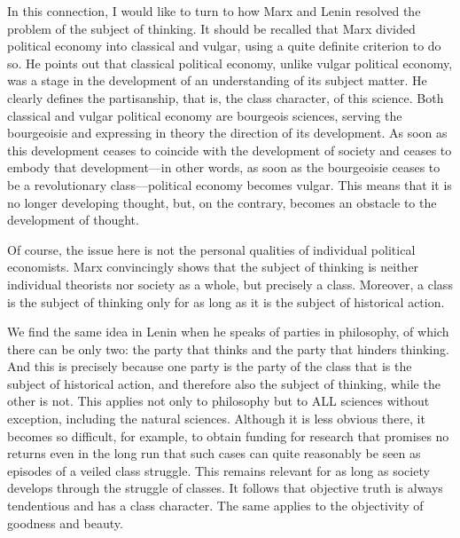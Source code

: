 \documentclass[../main]{subfiles}
\begin{document}
In this connection, I would like to turn to how Marx and Lenin resolved the problem of the subject of thinking. It should be recalled that Marx divided political economy into classical and vulgar, using a quite definite criterion to do so. He points out that classical political economy, unlike vulgar political economy, was a stage in the development of an understanding of its subject matter. He clearly defines the partisanship, that is, the class character, of this science. Both classical and vulgar political economy are bourgeois sciences, serving the bourgeoisie and expressing in theory the direction of its development. As soon as this development ceases to coincide with the development of society and ceases to embody that development—in other words, as soon as the bourgeoisie ceases to be a revolutionary class—political economy becomes vulgar. This means that it is no longer developing thought, but, on the contrary, becomes an obstacle to the development of thought.

Of course, the issue here is not the personal qualities of individual political economists. Marx convincingly shows that the subject of thinking is neither individual theorists nor society as a whole, but precisely a class. Moreover, a class is the subject of thinking only for as long as it is the subject of historical action.

We find the same idea in Lenin when he speaks of parties in philosophy, of which there can be only two: the party that thinks and the party that hinders thinking. And this is precisely because one party is the party of the class that is the subject of historical action, and therefore also the subject of thinking, while the other is not. This applies not only to philosophy but to ALL sciences without exception, including the natural sciences. Although it is less obvious there, it becomes so difficult, for example, to obtain funding for research that promises no returns even in the long run that such cases can quite reasonably be seen as episodes of a veiled class struggle. This remains relevant for as long as society develops through the struggle of classes. It follows that objective truth is always tendentious and has a class character. The same applies to the objectivity of goodness and beauty.
\end{document}
